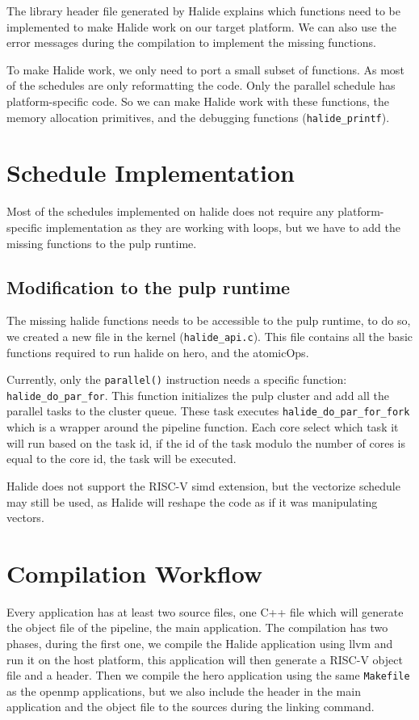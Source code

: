     The library header file generated by Halide explains which functions need to be implemented to make Halide work on our target platform. We can also use the error messages during the compilation to implement the missing functions.

    To make Halide work, we only need to port a small subset of functions. As most of the schedules are only reformatting the code.
    Only the parallel schedule has platform-specific code. So we can make Halide work with these functions, the memory allocation primitives, and the debugging functions (\texttt{halide\_printf}).

\section{Schedule Implementation }
    Most of the schedules implemented on halide does not require any platform-specific implementation as they are working with loops, but we have to add the missing functions to the \gls{pulp} runtime.

    \subsection{Modification to the \acrshort{pulp} runtime}

    The missing halide functions needs to be accessible to the \gls{pulp} runtime, to do so, we created a new file in the kernel (\texttt{halide\_api.c}). 
    This file contains all the basic functions required to run halide on \gls{hero}, and the \glspl{atomicOp}.

    Currently, only the \texttt{parallel()} instruction needs a specific function: \texttt{halide\_do\_par\_for}.
     This function initializes the \gls{pulp} cluster and add all the parallel tasks to the cluster queue. These task executes \texttt{halide\_do\_par\_for\_fork} which is a wrapper around the pipeline function.
    Each core select which task it will run based on the task id, if the id of the task modulo the number of cores is equal to the core id, the task will be executed.

    Halide does not support the RISC-V \gls{simd} extension, but the vectorize schedule may still be used, as Halide will reshape the code as if it was manipulating vectors.



\section{Compilation Workflow}
    Every application has at least two source files, one C++ file which will generate the object file of the pipeline, the main application. 
    The compilation has two phases, during the first one, we compile the Halide application using \gls{llvm} and run it on the host platform, this application will then generate a RISC-V object file and a header.
    Then we compile the hero application using the same \texttt{Makefile} as the \gls{openmp} applications, but we also include the header in the main application and the object file to the sources during the linking command.

